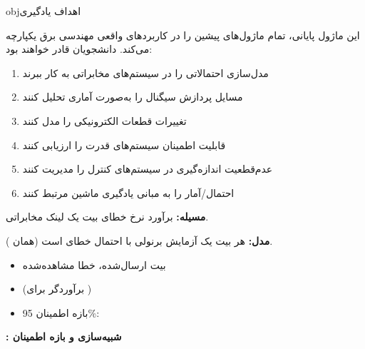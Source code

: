 \begin{PSbox}[unbreakable]{obj}{اهداف یادگیری}

این ماژول پایانی، تمام ماژول‌های پیشین را در کاربردهای واقعی مهندسی برق یکپارچه می‌کند. دانشجویان قادر خواهند بود:

\begin{enumerate}
\def\labelenumi{\arabic{enumi}.}
\tightlist
\item
  مدل‌سازی احتمالاتی را در سیستم‌های مخابراتی به کار ببرند
\item
  مسایل پردازش سیگنال را به‌صورت آماری تحلیل کنند
\item
  تغییرات قطعات الکترونیکی را مدل کنند
\item
  قابلیت اطمینان سیستم‌های قدرت را ارزیابی کنند
\item
  عدم‌قطعیت اندازه‌گیری در سیستم‌های کنترل را مدیریت کنند
\item
  احتمال/آمار را به مبانی یادگیری ماشین مرتبط کنند
\end{enumerate}

\end{PSbox}



\textbf{مسیله:} برآورد نرخ خطای بیت یک لینک مخابراتی.

\textbf{مدل:} هر بیت یک آزمایش برنولی با احتمال خطای  است (همان ).

\begin{itemize}
\tightlist
\item
   بیت ارسال‌شده،  خطا مشاهده‌شده
\item
   (برآوردگر  برای )
\item
  بازه اطمینان 95\%: 
\end{itemize}

\textbf{: شبیه‌سازی  و بازه اطمینان}


